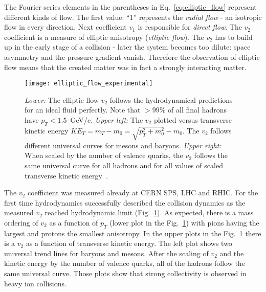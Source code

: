         The Fourier series elements in the parentheses in Eq.~\ref{eq:elliptic_flow} represent different kinds of flow.
        The first value: ``1'' represents the \textit{radial flow} - an isotropic flow in every direction.
        Next coefficient $v_1$ is responsible for \textit{direct flow}.
        The $v_2$ coefficient is a measure of elliptic anisotropy (\textit{elliptic flow}).
        The $v_2$ has to build up in the early stage of a collision - later the system becomes too dilute: space asymmetry and the pressure gradient vanish.
        Therefore the observation of elliptic flow means that the created matter was in fact a strongly interacting matter.
        \begin{figure}[h]
          \centering
          \texttt{[image: elliptic\_flow\_experimental]}
          \caption{\textit{Lower:} The elliptic flow $v_2$ follows the hydrodynamical predictions for an ideal fluid perfectly. Note that $> 99\%$ of all final hadrons have $p_T < 1.5$~GeV/c. \textit{Upper left:} The $v_2$ plotted versus transverse kinetic energy $KE_T = m_T - m_0 = \sqrt{p_T^2 + m_0^2} - m_0$. The $v_2$ follows different universal curves for mesons and baryons. \textit{Upper right:} When scaled by the number of valence quarks, the $v_2$ follows the same universal curve for all hadrons and for all values of scaled transverse kinetic energy~\cite{heinz}.}
          \label{fig:elliptic_flow_experimental}
        \end{figure}

        The $v_2$ coefficient was measured already at CERN SPS, LHC and RHIC.
        For the first time hydrodynamics successfully described the collision dynamics as the measured $v_2$ reached hydrodynamic limit (Fig.~\ref{fig:elliptic_flow_experimental}).
        As expected, there is a mass ordering of $v_2$ as a function of $p_T$ (lower plot in the Fig.~\ref{fig:elliptic_flow_experimental}) with pions having the largest and protons the smallest anisotropy.
        In the upper plots in the Fig.~\ref{fig:elliptic_flow_experimental} there is a $v_2$ as a function of transverse kinetic energy.
        The left plot shows two universal trend lines for baryons and mesons.
        After the scaling of $v_2$ and the kinetic energy by the number of valence quarks, all of the hadrons follow the same universal curve.
        Those plots show that strong collectivity is observed in heavy ion collisions.

      \FloatBarrier
